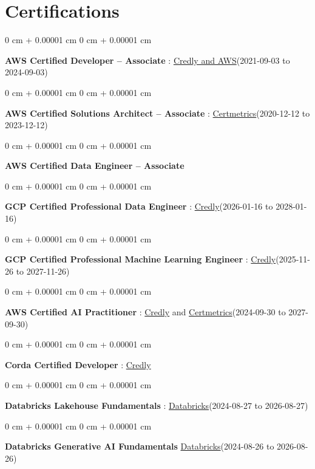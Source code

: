 \documentclass[10pt, letterpaper]{article}
\newenvironment{onecolentry}{
    \begin{adjustwidth}{
        0 cm + 0.00001 cm
    }{
        0 cm + 0.00001 cm
    }
}{
    \end{adjustwidth}
} %
\begin{document}
    \vspace{2 pt }
    \section{Certifications}
        \vspace{2 pt }
        \begin{samepage}
            \begin{onecolentry}
                \textbf{AWS Certified Developer – Associate} : \href{https://www.credly.com/badges/b8106fbd-d3d1-4204-8cdf-e708798fd582/public_url}{Credly and AWS}(2021-09-03  to 2024-09-03)
            \end{onecolentry}
            \begin{onecolentry}
                \textbf{AWS Certified Solutions Architect – Associate} : \href{https://cp.certmetrics.com/amazon/en/public/verify/credential/SNBY48EBJJVE1SWX}{Certmetrics}(2020-12-12 to 2023-12-12)
            \end{onecolentry}
            \begin{onecolentry}
                \textbf{AWS Certified Data Engineer – Associate}
            \end{onecolentry}
            \begin{onecolentry}
                \textbf{GCP Certified Professional Data Engineer} : \href{https://www.credly.com/badges/977e96d9-12e7-4f6c-b8a7-df71fb7153b8/public_url}{Credly}(2026-01-16 to 2028-01-16)
            \end{onecolentry}
            \begin{onecolentry}
                \textbf{GCP Certified Professional Machine Learning Engineer} : \href{https://www.credly.com/badges/a6965347-09ea-4d8f-b398-0e151407160d/public_url}{Credly}(2025-11-26 to 2027-11-26)
            \end{onecolentry}
            \begin{onecolentry}
                \textbf{AWS Certified AI Practitioner} : \href{https://www.credly.com/badges/451b7ba5-8be1-4a8e-bbec-ade26627a6b6/public_url}{Credly} and \href{https://cp.certmetrics.com/amazon/en/public/verify/credential/495f0d9853874bf9a33c17f8e89ce131}{Certmetrics}(2024-09-30 to 2027-09-30)
            \end{onecolentry}
            \begin{onecolentry}
                \textbf{Corda Certified Developer} : \href{https://www.credly.com/badges/7f29d39c-34b6-4de9-b07d-e10f1090a335/linked_in_profile}{Credly}
            \end{onecolentry}
                \begin{onecolentry}
                \textbf{Databricks Lakehouse Fundamentals} : \href{https://scl.io/FXGKS0u}{Databricks}(2024-08-27 to 2026-08-27)
            \end{onecolentry}
            \begin{onecolentry}
                \textbf{Databricks Generative AI Fundamentals} \href{https://sgq.io/3uIFGNi}{Databricks}(2024-08-26 to 2026-08-26)
            \end{onecolentry}
        \end{samepage}
\end{document}
